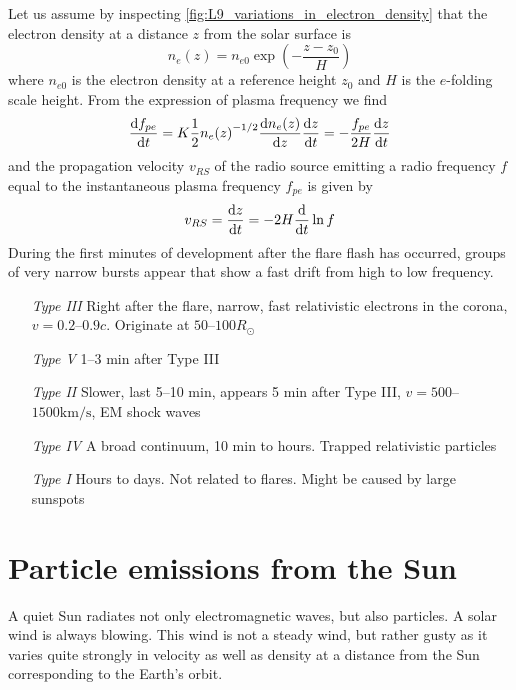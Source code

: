 Let us assume by inspecting \cref{fig:L9_variations_in_electron_density} that the electron density at a distance \(z\) from the solar surface is
\begin{equation*}
    n_e(z)=n_{e0}\exp\left(-\frac{z-z_0}{H}\right)
\end{equation*}
where \(n_{e0}\) is the electron density at a reference height \(z_0\) and \(H\) is the \(e\)-folding scale height. From the expression of plasma frequency we find
\begin{equation*}
    \fracd{f_{pe}}=K\frac{1}{2}n_e{(z)}^{-1/2}\fracd[z]{n_e(z)}\fracd{z}=-\frac{f_{pe}}{2H}\fracd{z}
\end{equation*}
and the propagation velocity \(v_{RS}\) of the radio source emitting a radio frequency \(f\) equal to the instantaneous plasma frequency \(f_{pe}\) is given by
\begin{equation*}
    v_{RS}=\fracd{z}=-2H\fracd{}\ln f
\end{equation*}
During the first minutes of development after the flare flash has occurred, groups of very narrow bursts appear that show a fast drift from high to low frequency.
\begin{enumerate}
    \item [\emph{Type III}] Right after the flare, narrow, fast relativistic electrons in the corona, \(v=0.2\)--\(0.9c\). Originate at \(50\)--\(100 R_\odot \)
    \item [\emph{Type V}] 1--3 min after Type III
    \item [\emph{Type II}] Slower, last 5--10 min, appears 5 min after Type III, \(v=500\)--\(1500\si{\kilo\metre/\second}\), EM shock waves
    \item [\emph{Type IV}] A broad continuum, 10 min to hours. Trapped relativistic particles
    \item [\emph{Type I}] Hours to days. Not related to flares. Might be caused by large sunspots
\end{enumerate}

\section{Particle emissions from the Sun}
A quiet Sun radiates not only electromagnetic waves, but also particles. A solar wind is always blowing. This wind is not a steady wind, but rather gusty as it varies quite strongly in velocity as well as density at a distance from the Sun corresponding to the Earth’s orbit.

